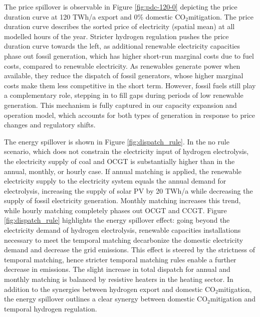 \documentclass[5p,numafflabel]{elsarticle}
\newcommand{\co}{\ce{CO2}~}
\def\co{CO${}_2${\:}}
\begin{document}
The price spillover is observable in Figure \ref{fig:pdc-120-0} depicting the price duration curve at 120 TWh/a export and 0\% domestic \co mitigation. The price duration curve describes the sorted price of electricity (spatial mean) at all modelled hours of the year.
Stricter hydrogen regulation pushes the price duration curve towards the left, as additional renewable electricity capacities phase out fossil generation, which has higher short-run marginal costs due to fuel costs, compared to renewable electricity.
As renewables generate power when available, they reduce the dispatch of fossil generators, whose higher marginal costs make them less competitive in the short term. However, fossil fuels still play a complementary role, stepping in to fill gaps during periods of low renewable generation. This mechanism is fully captured in our capacity expansion and operation model, which accounts for both types of generation in response to price changes and regulatory shifts.


The energy spillover is shown in Figure \ref{fig:dispatch_rule}. In the no rule scenario, which does not constrain the electricity input of hydrogen electrolysis, the electricity supply of coal and OCGT is substantially higher than in the annual, monthly, or hourly case. If annual matching is applied, the renewable electricity supply to the electricity system equals the annual demand for electrolysis, increasing the supply of solar PV by 20 TWh/a while decreasing the supply of fossil electricity generation. 
Monthly matching increases this trend, while hourly matching completely phases out OCGT and CCGT. Figure \ref{fig:dispatch_rule} highlights the energy spillover effect: going beyond the electricity demand of hydrogen electrolysis, renewable capacities installations necessary to meet the temporal matching decarbonize the domestic electricity demand and decrease the grid emissions. This effect is steered by the strictness of temporal matching, hence stricter temporal matching rules enable a further decrease in emissions.
The slight increase in total dispatch for annual and monthly matching is balanced by resistive heaters in the heating sector.
In addition to the synergies between hydrogen export and domestic \co mitigation, the energy spillover outlines a clear synergy between domestic \co mitigation and temporal hydrogen regulation.
\end{document}
